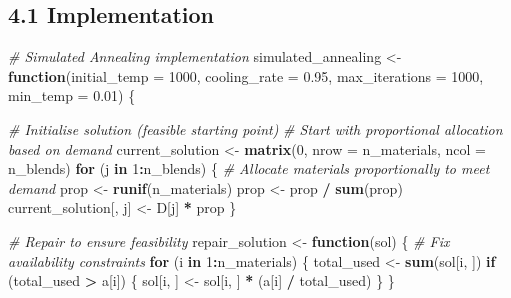 \documentclass[
]{article}
\newenvironment{Shaded}{\begin{snugshade}}{\end{snugshade}}
\newcommand{\AttributeTok}[1]{\textcolor[rgb]{0.13,0.29,0.53}{#1}}
\newcommand{\CommentTok}[1]{\textcolor[rgb]{0.56,0.35,0.01}{\textit{#1}}}
\newcommand{\ControlFlowTok}[1]{\textcolor[rgb]{0.13,0.29,0.53}{\textbf{#1}}}
\newcommand{\DecValTok}[1]{\textcolor[rgb]{0.00,0.00,0.81}{#1}}
\newcommand{\FloatTok}[1]{\textcolor[rgb]{0.00,0.00,0.81}{#1}}
\newcommand{\FunctionTok}[1]{\textcolor[rgb]{0.13,0.29,0.53}{\textbf{#1}}}
\newcommand{\NormalTok}[1]{#1}
\newcommand{\OtherTok}[1]{\textcolor[rgb]{0.56,0.35,0.01}{#1}}
\newcommand{\SpecialCharTok}[1]{\textcolor[rgb]{0.81,0.36,0.00}{\textbf{#1}}}
\begin{document}
\subsection{4.1 Implementation}\label{implementation-1}

\begin{Shaded}
\begin{Highlighting}[]
\CommentTok{\# Simulated Annealing implementation}
\NormalTok{simulated\_annealing }\OtherTok{\textless{}{-}} \ControlFlowTok{function}\NormalTok{(}\AttributeTok{initial\_temp =} \DecValTok{1000}\NormalTok{, }\AttributeTok{cooling\_rate =} \FloatTok{0.95}\NormalTok{, }
                                \AttributeTok{max\_iterations =} \DecValTok{1000}\NormalTok{, }\AttributeTok{min\_temp =} \FloatTok{0.01}\NormalTok{) \{}
  
  \CommentTok{\# Initialise solution (feasible starting point)}
  \CommentTok{\# Start with proportional allocation based on demand}
\NormalTok{  current\_solution }\OtherTok{\textless{}{-}} \FunctionTok{matrix}\NormalTok{(}\DecValTok{0}\NormalTok{, }\AttributeTok{nrow =}\NormalTok{ n\_materials, }\AttributeTok{ncol =}\NormalTok{ n\_blends)}
  \ControlFlowTok{for}\NormalTok{ (j }\ControlFlowTok{in} \DecValTok{1}\SpecialCharTok{:}\NormalTok{n\_blends) \{}
    \CommentTok{\# Allocate materials proportionally to meet demand}
\NormalTok{    prop }\OtherTok{\textless{}{-}} \FunctionTok{runif}\NormalTok{(n\_materials)}
\NormalTok{    prop }\OtherTok{\textless{}{-}}\NormalTok{ prop }\SpecialCharTok{/} \FunctionTok{sum}\NormalTok{(prop)}
\NormalTok{    current\_solution[, j] }\OtherTok{\textless{}{-}}\NormalTok{ D[j] }\SpecialCharTok{*}\NormalTok{ prop}
\NormalTok{  \}}
  
  \CommentTok{\# Repair to ensure feasibility}
\NormalTok{  repair\_solution }\OtherTok{\textless{}{-}} \ControlFlowTok{function}\NormalTok{(sol) \{}
    \CommentTok{\# Fix availability constraints}
    \ControlFlowTok{for}\NormalTok{ (i }\ControlFlowTok{in} \DecValTok{1}\SpecialCharTok{:}\NormalTok{n\_materials) \{}
\NormalTok{      total\_used }\OtherTok{\textless{}{-}} \FunctionTok{sum}\NormalTok{(sol[i, ])}
      \ControlFlowTok{if}\NormalTok{ (total\_used }\SpecialCharTok{\textgreater{}}\NormalTok{ a[i]) \{}
\NormalTok{        sol[i, ] }\OtherTok{\textless{}{-}}\NormalTok{ sol[i, ] }\SpecialCharTok{*}\NormalTok{ (a[i] }\SpecialCharTok{/}\NormalTok{ total\_used)}
\NormalTok{      \}}
\NormalTok{    \}}
    

\end{Highlighting}
\end{Shaded}
\end{document}
